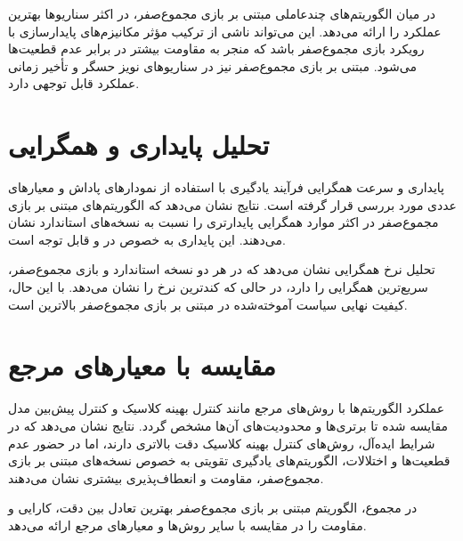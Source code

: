 
در میان الگوریتم‌های چندعاملی مبتنی بر بازی مجموع‌صفر،  در اکثر سناریوها بهترین عملکرد را ارائه می‌دهد. این می‌تواند ناشی از ترکیب مؤثر مکانیزم‌های پایدارسازی  با رویکرد بازی مجموع‌صفر باشد که منجر به مقاومت بیشتر در برابر عدم قطعیت‌ها می‌شود.  مبتنی بر بازی مجموع‌صفر نیز در سناریوهای نویز حسگر و تأخیر زمانی عملکرد قابل توجهی دارد.

\section{تحلیل پایداری و همگرایی}

پایداری و سرعت همگرایی فرآیند یادگیری با استفاده از نمودارهای پاداش و معیارهای عددی مورد بررسی قرار گرفته است. نتایج نشان می‌دهد که الگوریتم‌های مبتنی بر بازی مجموع‌صفر در اکثر موارد همگرایی پایدارتری را نسبت به نسخه‌های استاندارد نشان می‌دهند. این پایداری به خصوص در  و  قابل توجه است.

تحلیل نرخ همگرایی نشان می‌دهد که  در هر دو نسخه استاندارد و بازی مجموع‌صفر، سریع‌ترین همگرایی را دارد، در حالی که  کندترین نرخ را نشان می‌دهد. با این حال، کیفیت نهایی سیاست آموخته‌شده در  مبتنی بر بازی مجموع‌صفر بالاترین است.

\section{مقایسه با معیارهای مرجع}

عملکرد الگوریتم‌ها با روش‌های مرجع مانند کنترل بهینه کلاسیک و کنترل پیش‌بین مدل مقایسه شده تا برتری‌ها و محدودیت‌های آن‌ها مشخص گردد. نتایج نشان می‌دهد که در شرایط ایده‌آل، روش‌های کنترل بهینه کلاسیک دقت بالاتری دارند، اما در حضور عدم قطعیت‌ها و اختلالات، الگوریتم‌های یادگیری تقویتی به خصوص نسخه‌های مبتنی بر بازی مجموع‌صفر، مقاومت و انعطاف‌پذیری بیشتری نشان می‌دهند.

در مجموع، الگوریتم  مبتنی بر بازی مجموع‌صفر بهترین تعادل بین دقت، کارایی و مقاومت را در مقایسه با سایر روش‌ها و معیارهای مرجع ارائه می‌دهد.
